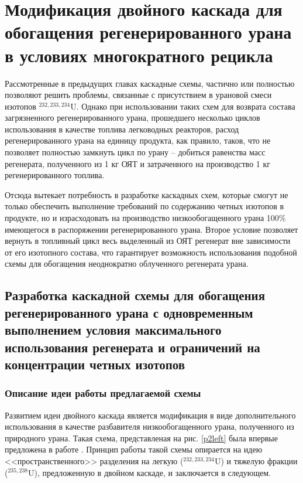 \chapter{Модификация двойного каскада для обогащения регенерированного урана в условиях многократного рецикла}\label{ch:ch3}

Рассмотренные в предыдущих главах каскадные схемы, частично или полностью позволяют решить проблемы, связанные с присутствием в урановой смеси изотопов $^{232,233,234}$U. Однако при использовании таких схем для возврата состава загрязненного регенерированного урана, прошедшего несколько циклов использования в качестве топлива легководных реакторов, расход регенерированного урана на единицу продукта, как правило, таков, что не позволяет полностью замкнуть цикл по урану -- добиться равенства масс регенерата, полученного из 1 кг ОЯТ и затраченного на производство 1 кг регенерированного топлива.

Отсюда вытекает потребность в разработке каскадных схем, которые смогут не только обеспечить выполнение требований по содержанию четных изотопов в продукте, но и израсходовать на производство низкообогащенного урана 100\% имеющегося в распоряжении регенерированного урана. Второе условие позволяет вернуть в топливный цикл весь выделенный из ОЯТ регенерат вне зависимости от его изотопного состава, что гарантирует возможность использования подобной схемы для обогащения неоднократно облученного регенерата урана.

\section{Разработка каскадной схемы для обогащения регенерированного урана с одновременным выполнением условия максимального использования регенерата и ограничений на концентрации четных изотопов}
\subsection{Описание идеи работы предлагаемой схемы}

Развитием идеи двойного каскада является модификация в виде дополнительного использования в качестве разбавителя низкообогащенного урана, полученного из природного урана. Такая схема, представленая на рис. \ref{p2left} была впервые предложена в работе \cite{vodolazskihSposobIzotopnogoVosstanovleniya2006}. Принцип работы такой схемы опирается на идею <<пространственного>> разделения на легкую ($^{232,233,234}$U) и тяжелую фракции ($^{235,238}$U), предложенную в двойном каскаде, и заключается в следующем. 

